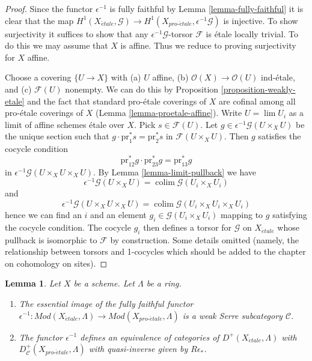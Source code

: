 \documentclass[10pt,a4paper]{article}
\theoremstyle{plain}
\newtheorem{lemma}[subsection]{Lemma}
\theoremstyle{definition}
\theoremstyle{remark}
\numberwithin{equation}{subsection}
\def\lim{\mathop{\mathrm{lim}}\nolimits}
\def\colim{\mathop{\mathrm{colim}}\nolimits}
\def\proetale{{pro\text{-}\acute{e}tale}}
\def\etale{{\acute{e}tale}}
\begin{document}
\begin{proof}
Since the functor $\epsilon^{-1}$ is fully faithful by
Lemma \ref{lemma-fully-faithful}
it is clear that the map
$H^1(X_\etale, \mathcal{G}) \to H^1(X_\proetale, \epsilon^{-1}\mathcal{G})$
is injective. To show surjectivity it suffices to show that
any $\epsilon^{-1}\mathcal{G}$-torsor $\mathcal{F}$ is \'etale
locally trivial. To do this we may assume that $X$ is affine.
Thus we reduce to proving surjectivity for $X$ affine.

\medskip\noindent
Choose a covering $\{U \to X\}$ with (a) $U$ affine, (b)
$\mathcal{O}(X) \to \mathcal{O}(U)$ ind-\'etale, and (c) $\mathcal{F}(U)$
nonempty. We can do this by Proposition \ref{proposition-weakly-etale}
and the fact that
standard pro-\'etale coverings of $X$ are cofinal among all pro-\'etale
coverings of $X$ (Lemma \ref{lemma-proetale-affine}).
Write $U = \lim U_i$ as a limit of affine schemes \'etale over $X$.
Pick $s \in \mathcal{F}(U)$. Let
$g \in \epsilon^{-1}\mathcal{G}(U \times_X U)$
be the unique section such that $g \cdot \text{pr}_1^*s = \text{pr}_2^*s$ in
$\mathcal{F}(U \times_X U)$. Then $g$ satisfies the cocycle condition
$$
\text{pr}_{12}^*g \cdot \text{pr}_{23}^*g = \text{pr}_{13}^*g
$$
in $\epsilon^{-1}\mathcal{G}(U \times_X U \times_X U)$. By
Lemma \ref{lemma-limit-pullback}
we have
$$
\epsilon^{-1}\mathcal{G}(U \times_X U) =
\colim \mathcal{G}(U_i \times_X U_i)
$$
and
$$
\epsilon^{-1}\mathcal{G}(U \times_X U \times_X U) =
\colim \mathcal{G}(U_i \times_X U_i \times_X U_i)
$$
hence we can find an $i$ and an element $g_i \in \mathcal{G}(U_i \times_X U_i)$
mapping to $g$ satisfying the cocycle condition.
The cocycle $g_i$ then defines a torsor for $\mathcal{G}$ on
$X_\etale$ whose pullback is isomorphic to $\mathcal{F}$
by construction. Some details omitted (namely, the relationship
between torsors and 1-cocycles which should be added to the chapter
on cohomology on sites).
\end{proof}

\begin{lemma}
\label{lemma-compare-derived}
Let $X$ be a scheme. Let $\Lambda$ be a ring.
\begin{enumerate}
\item The essential image of the fully faithful functor
$\epsilon^{-1} : \textit{Mod}(X_\etale, \Lambda) \to
\textit{Mod}(X_\proetale, \Lambda)$
is a weak Serre subcategory $\mathcal{C}$.
\item The functor $\epsilon^{-1}$ defines an equivalence of categories
of $D^+(X_\etale, \Lambda)$ with $D^+_\mathcal{C}(X_\proetale, \Lambda)$
with quasi-inverse given by $R\epsilon_*$.
\end{enumerate}
\end{lemma}
\end{document}
